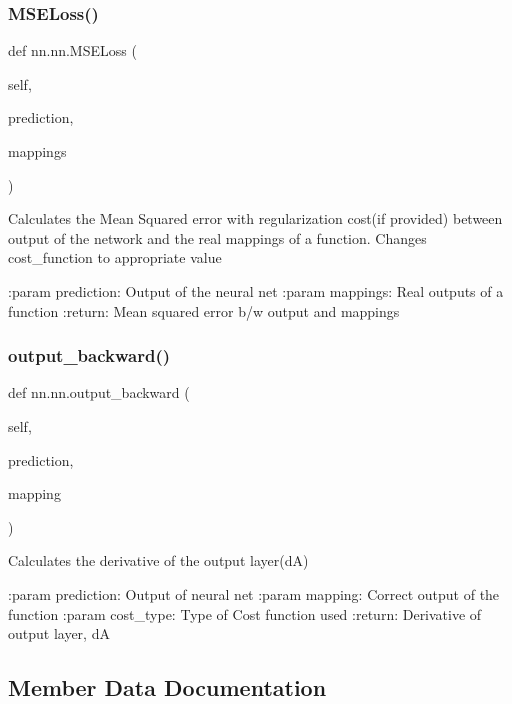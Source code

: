 \subsubsection{\texorpdfstring{M\+S\+E\+Loss()}{MSELoss()}}
{\footnotesize\ttfamily def nn.\+nn.\+M\+S\+E\+Loss (\begin{DoxyParamCaption}\item[{}]{self,  }\item[{}]{prediction,  }\item[{}]{mappings }\end{DoxyParamCaption})}

\begin{DoxyVerb}Calculates the Mean Squared error with regularization cost(if provided) between output of the network and the real
mappings of a function.
Changes cost_function to appropriate value

:param prediction: Output of the neural net
:param mappings: Real outputs of a function
:return: Mean squared error b/w output and mappings
\end{DoxyVerb}
 \mbox{\label{classnn_1_1nn_afa7d1462872fae95fe71f27ed00bf7ae}} 
\subsubsection{\texorpdfstring{output\+\_\+backward()}{output\_backward()}}
{\footnotesize\ttfamily def nn.\+nn.\+output\+\_\+backward (\begin{DoxyParamCaption}\item[{}]{self,  }\item[{}]{prediction,  }\item[{}]{mapping }\end{DoxyParamCaption})}

\begin{DoxyVerb}Calculates the derivative of the output layer(dA)

:param prediction: Output of neural net
:param mapping: Correct output of the function
:param cost_type: Type of Cost function used
:return: Derivative of output layer, dA  
\end{DoxyVerb}
 

\subsection{Member Data Documentation}
\mbox{\label{classnn_1_1nn_acb7fb4cc0db120b007ef1ab1f82d7ba0}} 
